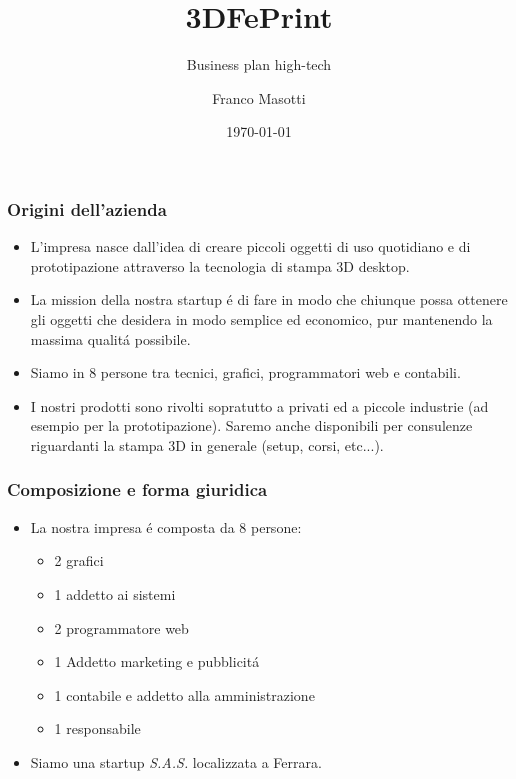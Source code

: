\documentclass{beamer}
\title{3DFePrint}
\subtitle{Business plan high-tech}
\author{Franco Masotti}
\date{\today}
\begin{document}
    \frame{\titlepage}

    \begin{frame}
        \frametitle{Origini dell'azienda}
            \begin{itemize}
                \item L'impresa nasce dall'idea di creare piccoli oggetti di 
uso quotidiano e di prototipazione attraverso la tecnologia di stampa 3D 
desktop.
                \item La mission della nostra startup \'e di fare in modo che 
chiunque possa ottenere gli oggetti che desidera in modo semplice ed 
economico, pur mantenendo la massima qualit\'a possibile.
                \item Siamo in 8 persone tra tecnici, grafici, programmatori 
web e contabili.
                \item I nostri prodotti sono rivolti sopratutto a privati ed a  
piccole industrie (ad esempio per la prototipazione). Saremo anche disponibili 
per consulenze riguardanti la stampa 3D in generale (setup, corsi, etc...).
            \end{itemize}
    \end{frame}

    \begin{frame}
        \frametitle{Composizione e forma giuridica}
            \begin{itemize}
                \item La nostra impresa \'e composta da 8 persone:
                \begin{itemize}
                    \item 2 grafici
                    \item 1 addetto ai sistemi
                    \item 2 programmatore web
                    \item 1 Addetto marketing e pubblicit\'a
                    \item 1 contabile e addetto alla amministrazione
                    \item 1 responsabile
                \end{itemize}
                \item Siamo una startup \emph{S.A.S.} localizzata a Ferrara.
            \end{itemize}
    \end{frame}
\end{document}
